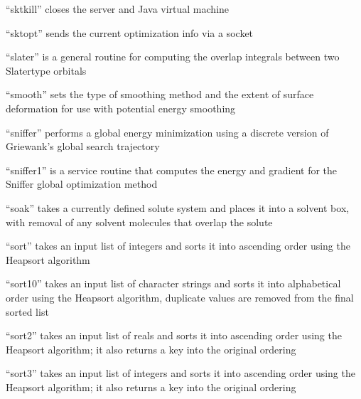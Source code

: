 \documentclass[letterpaper,11pt,english]{sphinxmanual}
\begin{document}

“sktkill” closes the server and Java virtual machine


“sktopt” sends the current optimization info via a socket


“slater” is a general routine for computing the overlap integrals between two Slater\sphinxhyphen{}type orbitals


“smooth” sets the type of smoothing method and the extent of surface deformation for use with potential energy smoothing


“sniffer” performs a global energy minimization using a discrete version of Griewank’s global search trajectory


“sniffer1” is a service routine that computes the energy and gradient for the Sniffer global optimization method


“soak” takes a currently defined solute system and places it into a solvent box, with removal of any solvent molecules that overlap the solute


“sort” takes an input list of integers and sorts it into ascending order using the Heapsort algorithm


“sort10” takes an input list of character strings and sorts it into alphabetical order using the Heapsort algorithm, duplicate values are removed from the final sorted list


“sort2” takes an input list of reals and sorts it into ascending order using the Heapsort algorithm; it also returns a key into the original ordering


“sort3” takes an input list of integers and sorts it into ascending order using the Heapsort algorithm; it also returns a key into the original ordering
\end{document}
